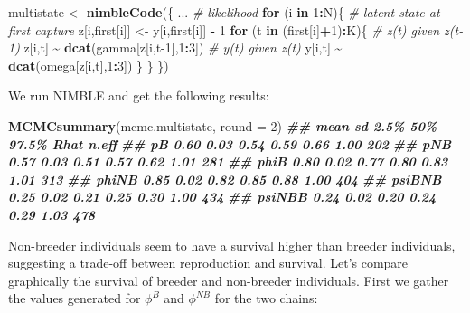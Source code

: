 \documentclass[
  12pt,
]{krantz}
\newenvironment{Shaded}{\begin{snugshade}}{\end{snugshade}}
\newcommand{\AttributeTok}[1]{\textcolor[rgb]{0.13,0.29,0.53}{#1}}
\newcommand{\CommentTok}[1]{\textcolor[rgb]{0.56,0.35,0.01}{\textit{#1}}}
\newcommand{\ControlFlowTok}[1]{\textcolor[rgb]{0.13,0.29,0.53}{\textbf{#1}}}
\newcommand{\DecValTok}[1]{\textcolor[rgb]{0.00,0.00,0.81}{#1}}
\newcommand{\DocumentationTok}[1]{\textcolor[rgb]{0.56,0.35,0.01}{\textbf{\textit{#1}}}}
\newcommand{\FunctionTok}[1]{\textcolor[rgb]{0.13,0.29,0.53}{\textbf{#1}}}
\newcommand{\NormalTok}[1]{#1}
\newcommand{\OtherTok}[1]{\textcolor[rgb]{0.56,0.35,0.01}{#1}}
\newcommand{\SpecialCharTok}[1]{\textcolor[rgb]{0.81,0.36,0.00}{\textbf{#1}}}
\begin{document}
\begin{Shaded}
\begin{Highlighting}[]
\NormalTok{multistate }\OtherTok{\textless{}{-}} \FunctionTok{nimbleCode}\NormalTok{(\{}
\NormalTok{...}
  \CommentTok{\# likelihood}
  \ControlFlowTok{for}\NormalTok{ (i }\ControlFlowTok{in} \DecValTok{1}\SpecialCharTok{:}\NormalTok{N)\{}
    \CommentTok{\# latent state at first capture}
\NormalTok{    z[i,first[i]] }\OtherTok{\textless{}{-}}\NormalTok{ y[i,first[i]] }\SpecialCharTok{{-}} \DecValTok{1}
    \ControlFlowTok{for}\NormalTok{ (t }\ControlFlowTok{in}\NormalTok{ (first[i]}\SpecialCharTok{+}\DecValTok{1}\NormalTok{)}\SpecialCharTok{:}\NormalTok{K)\{}
      \CommentTok{\# z(t) given z(t{-}1)}
\NormalTok{      z[i,t] }\SpecialCharTok{\textasciitilde{}} \FunctionTok{dcat}\NormalTok{(gamma[z[i,t}\DecValTok{{-}1}\NormalTok{],}\DecValTok{1}\SpecialCharTok{:}\DecValTok{3}\NormalTok{])}
      \CommentTok{\# y(t) given z(t)}
\NormalTok{      y[i,t] }\SpecialCharTok{\textasciitilde{}} \FunctionTok{dcat}\NormalTok{(omega[z[i,t],}\DecValTok{1}\SpecialCharTok{:}\DecValTok{3}\NormalTok{])}
\NormalTok{    \}}
\NormalTok{  \}}
\NormalTok{\})}
\end{Highlighting}
\end{Shaded}

We run NIMBLE and get the following results:

\begin{Shaded}
\begin{Highlighting}[]
\FunctionTok{MCMCsummary}\NormalTok{(mcmc.multistate, }\AttributeTok{round =} \DecValTok{2}\NormalTok{)}
\DocumentationTok{\#\#        mean   sd 2.5\%  50\% 97.5\% Rhat n.eff}
\DocumentationTok{\#\# pB     0.60 0.03 0.54 0.59  0.66 1.00   202}
\DocumentationTok{\#\# pNB    0.57 0.03 0.51 0.57  0.62 1.01   281}
\DocumentationTok{\#\# phiB   0.80 0.02 0.77 0.80  0.83 1.01   313}
\DocumentationTok{\#\# phiNB  0.85 0.02 0.82 0.85  0.88 1.00   404}
\DocumentationTok{\#\# psiBNB 0.25 0.02 0.21 0.25  0.30 1.00   434}
\DocumentationTok{\#\# psiNBB 0.24 0.02 0.20 0.24  0.29 1.03   478}
\end{Highlighting}
\end{Shaded}

Non-breeder individuals seem to have a survival higher than breeder individuals, suggesting a trade-off between reproduction and survival. Let's compare graphically the survival of breeder and non-breeder individuals. First we gather the values generated for \(\phi^B\) and \(\phi^{NB}\) for the two chains:
\end{document}
